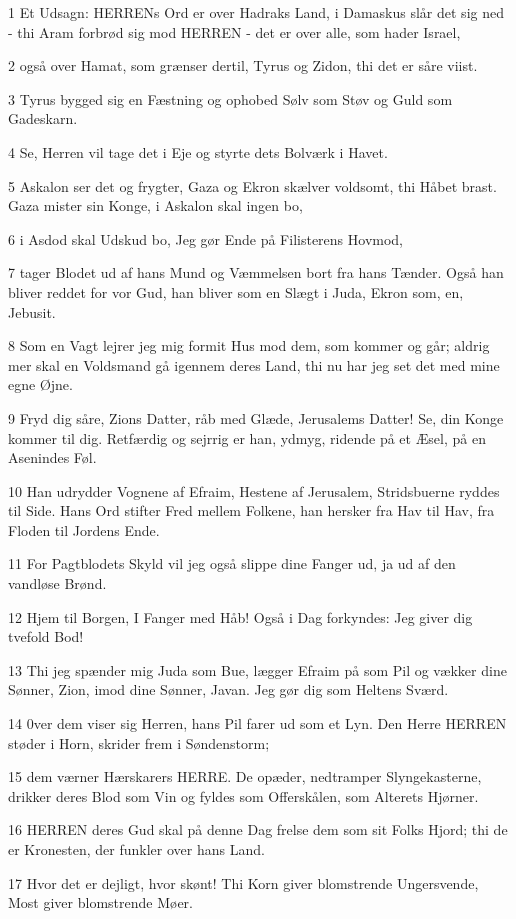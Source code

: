 \par 1 Et Udsagn: HERRENs Ord er over Hadraks Land, i Damaskus slår det sig ned - thi Aram forbrød sig mod HERREN - det er over alle, som hader Israel,
\par 2 også over Hamat, som grænser dertil, Tyrus og Zidon, thi det er såre viist.
\par 3 Tyrus bygged sig en Fæstning og ophobed Sølv som Støv og Guld som Gadeskarn.
\par 4 Se, Herren vil tage det i Eje og styrte dets Bolværk i Havet.
\par 5 Askalon ser det og frygter, Gaza og Ekron skælver voldsomt, thi Håbet brast. Gaza mister sin Konge, i Askalon skal ingen bo,
\par 6 i Asdod skal Udskud bo, Jeg gør Ende på Filisterens Hovmod,
\par 7 tager Blodet ud af hans Mund og Væmmelsen bort fra hans Tænder. Også han bliver reddet for vor Gud, han bliver som en Slægt i Juda, Ekron som, en, Jebusit.
\par 8 Som en Vagt lejrer jeg mig formit Hus mod dem, som kommer og går; aldrig mer skal en Voldsmand gå igennem deres Land, thi nu har jeg set det med mine egne Øjne.
\par 9 Fryd dig såre, Zions Datter, råb med Glæde, Jerusalems Datter! Se, din Konge kommer til dig. Retfærdig og sejrrig er han, ydmyg, ridende på et Æsel, på en Asenindes Føl.
\par 10 Han udrydder Vognene af Efraim, Hestene af Jerusalem, Stridsbuerne ryddes til Side. Hans Ord stifter Fred mellem Folkene, han hersker fra Hav til Hav, fra Floden til Jordens Ende.
\par 11 For Pagtblodets Skyld vil jeg også slippe dine Fanger ud, ja ud af den vandløse Brønd.
\par 12 Hjem til Borgen, I Fanger med Håb! Også i Dag forkyndes: Jeg giver dig tvefold Bod!
\par 13 Thi jeg spænder mig Juda som Bue, lægger Efraim på som Pil og vækker dine Sønner, Zion, imod dine Sønner, Javan. Jeg gør dig som Heltens Sværd.
\par 14 0ver dem viser sig Herren, hans Pil farer ud som et Lyn. Den Herre HERREN støder i Horn, skrider frem i Søndenstorm;
\par 15 dem værner Hærskarers HERRE. De opæder, nedtramper Slyngekasterne, drikker deres Blod som Vin og fyldes som Offerskålen, som Alterets Hjørner.
\par 16 HERREN deres Gud skal på denne Dag frelse dem som sit Folks Hjord; thi de er Kronesten, der funkler over hans Land.
\par 17 Hvor det er dejligt, hvor skønt! Thi Korn giver blomstrende Ungersvende, Most giver blomstrende Møer.

